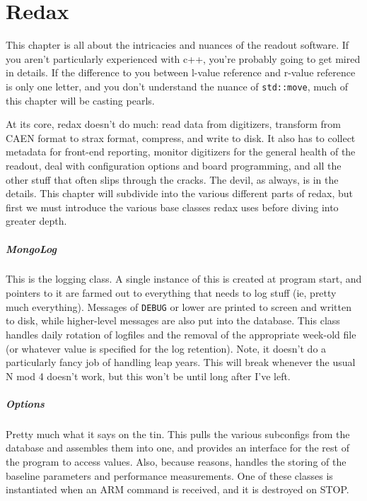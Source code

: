 
\chapter{Redax}

This chapter is all about the intricacies and nuances of the readout software.
If you aren't particularly experienced with c++, you're probably going to get mired in details.
If the difference to you between l-value reference and r-value reference is only one letter, and you don't understand the nuance of \texttt{std::move}, much of this chapter will be casting pearls.

At its core, redax doesn't do much: read data from digitizers, transform from CAEN format to strax format, compress, and write to disk.
It also has to collect metadata for front-end reporting, monitor digitizers for the general health of the readout, deal with configuration options and board programming, and all the other stuff that often slips through the cracks.
The devil, as always, is in the details.
This chapter will subdivide into the various different parts of redax, but first we must introduce the various base classes redax uses before diving into greater depth.

\paragraph{MongoLog}

This is the logging class.
A single instance of this is created at program start, and pointers to it are farmed out to everything that needs to log stuff (ie, pretty much everything).
Messages of \texttt{DEBUG} or lower are printed to screen and written to disk, while higher-level messages are also put into the database.
This class handles daily rotation of logfiles and the removal of the appropriate week-old file (or whatever value is specified for the log retention).
Note, it doesn't do a particularly fancy job of handling leap years.
This will break whenever the usual N mod 4 doesn't work, but this won't be until long after I've left.

\paragraph{Options}

Pretty much what it says on the tin.
This pulls the various subconfigs from the database and assembles them into one, and provides an interface for the rest of the program to access values.
Also, because reasons, handles the storing of the baseline parameters and performance measurements.
One of these classes is instantiated when an ARM command is received, and it is destroyed on STOP.

